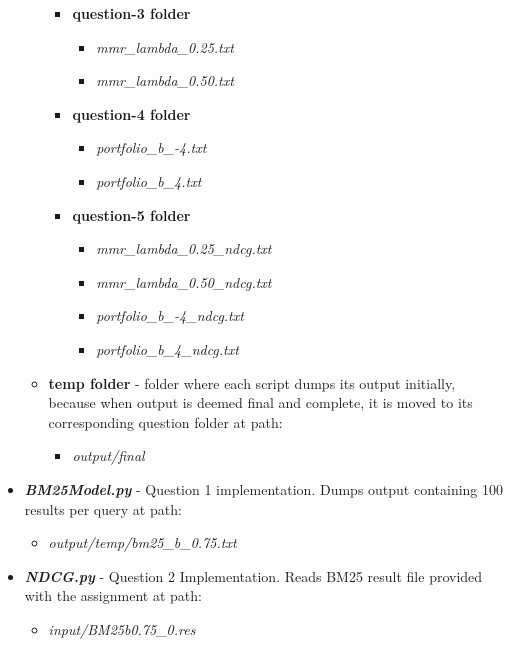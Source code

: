 \documentclass{article} %
\begin{document}
\begin{itemize}
\begin{itemize}
\begin{itemize}
            \item \textbf{question-3 folder}
            \begin{itemize}
                \item \textit{mmr\_lambda\_0.25.txt}
                \item \textit{mmr\_lambda\_0.50.txt}
            \end{itemize}
            \item \textbf{question-4 folder}
            \begin{itemize}
                \item \textit{portfolio\_b\_-4.txt}
                \item \textit{portfolio\_b\_4.txt}
            \end{itemize}
            \item \textbf{question-5 folder}
            \begin{itemize}
                \item \textit{mmr\_lambda\_0.25\_ndcg.txt}
                \item \textit{mmr\_lambda\_0.50\_ndcg.txt}
                \item \textit{portfolio\_b\_-4\_ndcg.txt}
                \item \textit{portfolio\_b\_4\_ndcg.txt}
            \end{itemize}
        \end{itemize}
        \item \textbf{temp folder} - folder where each script dumps its output initially, because when output is deemed final and complete, it is moved to its corresponding question folder at path: 
        \begin{itemize}
            \item \textit{output/final}
        \end{itemize}
    \end{itemize}
    \item \textit{\textbf{BM25Model.py}} - Question 1 implementation. Dumps output containing 100 results per query at path: 
    \begin{itemize}
        \item \textit{output/temp/bm25\_b\_0.75.txt}
    \end{itemize}
    \item \textit{\textbf{NDCG.py}} - Question 2 Implementation. Reads BM25 result file provided with the assignment at path:
    \begin{itemize}
        \item \textit{input/BM25b0.75\_0.res}    

\end{itemize}
\end{itemize}
\end{document}
